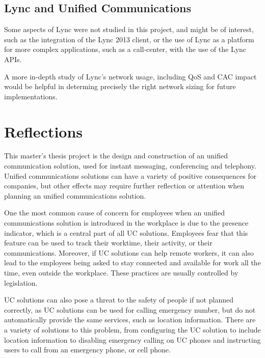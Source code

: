 \subsection{Lync and Unified Communications}
Some aspects of Lync were not studied in this project, and might be of interest, such as the integration of the Lync 2013 client, or the use of Lync as a platform for more complex applications, such as a call-center, with the use of the Lync APIs.

A more in-depth study of Lync's network usage, including QoS and CAC impact would be helpful in determing precisely the right network sizing for future implementations.

\section{Reflections}
This master's thesis project is the design and construction of an unified communication solution, used for instant messaging, conferencing and telephony. Unified communications solutions can have a variety of positive consequences for companies, but other effects may require further reflection or attention when planning an unified communications solution.

One the most common cause of concern for employees when an unified communications solution is introduced in the workplace is due to the presence indicator, which is a central part of all UC solutions. Employees fear that this feature can be used to track their worktime, their activity, or their communications. Moreover, if UC solutions can help remote workers, it can also lead to the employees being asked to stay connected and available for work all the time, even outside the workplace. These practices are usually controlled by legislation.

UC solutions can also pose a threat to the safety of people if not planned correctly, as UC solutions can be used for calling emergency number, but do not automatically provide the same services, such as location information. There are a variety of solutions to this problem, from configuring the UC solution to include location information to disabling emergency calling on UC phones and instructing users to call from an emergency phone, or cell phone.



